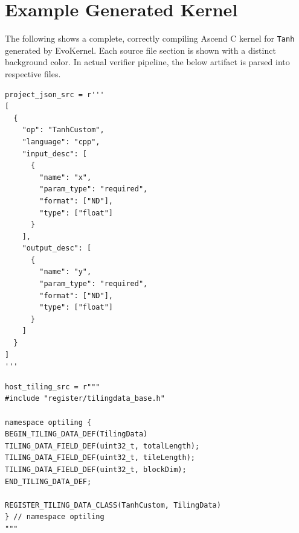 \documentclass{article} %
\newcommand{\ourmethod}{EvoKernel\xspace}
\theoremstyle{definition}
\theoremstyle{remark}
\begin{document}
  \section{Example Generated Kernel}
  \label{app:generated_kernel}

  The following shows a complete, correctly compiling Ascend C kernel for \texttt{Tanh} generated by \ourmethod. Each source file section is shown with a distinct background color. In actual verifier pipeline, the below artifact is parsed into respective files.

  \begin{tcolorbox}[colback=blue!5, colframe=blue!30, boxrule=0.3pt, arc=0pt, left=2pt, right=2pt, top=1pt, bottom=0pt, breakable, nobeforeafter]
  \begin{verbatim}
project_json_src = r'''
[
  {
    "op": "TanhCustom",
    "language": "cpp",
    "input_desc": [
      {
        "name": "x",
        "param_type": "required",
        "format": ["ND"],
        "type": ["float"]
      }
    ],
    "output_desc": [
      {
        "name": "y",
        "param_type": "required",
        "format": ["ND"],
        "type": ["float"]
      }
    ]
  }
]
'''
  \end{verbatim}
  \end{tcolorbox}

  \begin{tcolorbox}[colback=green!5, colframe=green!30, boxrule=0.3pt, arc=0pt, left=2pt, right=2pt, top=0pt, bottom=0pt, breakable, nobeforeafter]
  \begin{verbatim}
host_tiling_src = r"""
#include "register/tilingdata_base.h"

namespace optiling {
BEGIN_TILING_DATA_DEF(TilingData)
TILING_DATA_FIELD_DEF(uint32_t, totalLength);
TILING_DATA_FIELD_DEF(uint32_t, tileLength);
TILING_DATA_FIELD_DEF(uint32_t, blockDim);
END_TILING_DATA_DEF;

REGISTER_TILING_DATA_CLASS(TanhCustom, TilingData)
} // namespace optiling
"""
  \end{verbatim}
  \end{tcolorbox}
\end{document}
